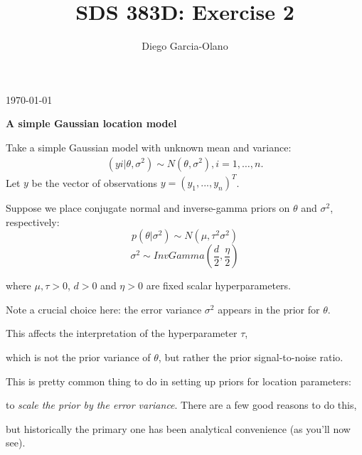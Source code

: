 \documentclass{homework}
\title{SDS 383D: Exercise 2}
\author{Diego Garcia-Olano}
\begin{document}
\makeatletter
\begin{titlepage}
	\vspace*{\fill}
	\centering
	{\huge \@title \par}
	\vskip0.5cm
	{\large \@author \par}
	\vskip0.5cm
	{\large \today \par}
	\vspace*{\fill}
\end{titlepage}
\makeatother
\newpage 
\mbox{}
\thispagestyle{empty}
\newpage
\setcounter{page}{1}


\par \textbf{A simple Gaussian location model}
\par Take a simple Gaussian model with unknown mean and variance:
\begin{equation} \begin{split}
(yi | \theta,\sigma^2) \sim N(\theta,\sigma^2) , i = 1,\dots,n. 
\end{split}\end{equation}
Let $y$ be the vector of observations $y = (y_1, . . . , y_n)^T$.\\

\par Suppose we place conjugate normal and inverse-gamma priors on $\theta$  and $\sigma^2$, respectively:
$$p(\theta | \sigma^2) \sim N(\mu, \tau^2\sigma^2 )$$
$$\sigma^2 \sim InvGamma(\frac{d}{2}, \frac{\eta}{2} )$$
\par where $\mu, \tau > 0$, $d > 0$ and $\eta > 0$ are fixed scalar hyperparameters.\\

\par *Note a crucial choice here: the error variance $\sigma^2$ appears in the prior for $\theta$. 
\par This affects the interpretation of the hyperparameter $\tau$, \par which is not the prior variance of $\theta$, but rather the prior signal-to-noise ratio.\par This is pretty common thing to do in setting up priors for location parameters: \par to \textit{ scale the prior by the error variance}. There are a few good reasons to do this, \par but historically the primary one has been analytical convenience (as you'll now see). \\
\end{document}
